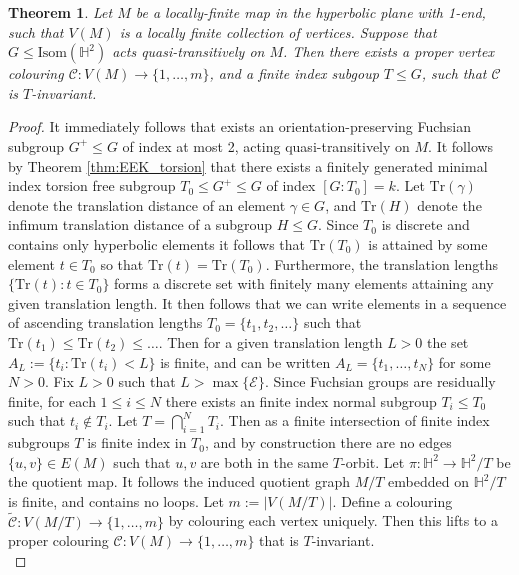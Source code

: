 \documentclass{article}
\numberwithin{equation}{section}
\newcommand{\HH}{\mathbb{H}}
\newtheorem{theorem}[lemma]{Theorem}
\theoremstyle{definition}
\theoremstyle{remark}
\begin{document}
\begin{theorem}\label{thm:main_Hyp}
    Let $M$ be a locally-finite map in the hyperbolic plane with 1-end, such that $V(M)$ is a locally finite collection of vertices. Suppose that $G\leq\text{Isom}(\HH^2)$ acts quasi-transitively on $M$. Then there exists a proper vertex colouring $\mathcal{C}:V(M)\rightarrow \{1,\ldots,m\}$, and a finite index subgoup $T\leq G$, such that $\mathcal{C}$ is $T$-invariant.
\end{theorem}
\begin{proof}
    It immediately follows that exists an orientation-preserving Fuchsian subgroup $G^+\leq G$ of index at most 2, acting quasi-transitively on $M$. It follows by Theorem \ref{thm:EEK_torsion} that there exists a finitely generated minimal index torsion free subgroup $T_0\leq G^+\leq G$ of index $[G:T_0]=k$. Let $\text{Tr}(\gamma)$ denote the translation distance of an element $\gamma\in G$, and $\text{Tr}(H)$ denote the infimum translation distance of a subgroup $H\leq G$. Since $T_0$ is discrete and contains only hyperbolic elements it follows that $\text{Tr}(T_0)$ is attained by some element $t\in T_0$ so that $\text{Tr}(t)=\text{Tr}(T_0)$. Furthermore, the translation lengths $\{\text{Tr}(t):t\in T_0\}$ forms a discrete set with finitely many elements attaining any given translation length. It then follows that we can write elements in a sequence of ascending translation lengths $T_0=\{t_1,t_2,\ldots\}$ such that $\text{Tr}(t_1)\leq \text{Tr}(t_2)\leq \ldots$\;. Then for a given translation length $L>0$ the set $A_L:=\{t_i: \text{Tr}(t_i)<L\}$ is finite, and can be written $A_L=\{t_1,\ldots,t_{N}\}$ for some $N>0$. Fix $L>0$ such that $L>\max\{\mathcal{E}\}$.
    Since Fuchsian groups are residually finite, for each $1\leq i\leq N$ there exists an finite index normal subgroup $T_i\leq T_0$ such that $t_i\not\in T_i$. Let $T=\bigcap_{i=1}^{N}T_i$. Then as a finite intersection of finite index subgroups $T$ is finite index in $T_0$, and by construction there are no edges $\{u,v\}\in E(M)$ such that $u,v$ are both in the same $T$-orbit. 
    Let $\pi:\HH^2\rightarrow \HH^2/T$ be the quotient map. It follows the induced quotient graph $M/T$ embedded on $\HH^2/T$ is finite, and contains no loops. Let $m:=|V(M/T)|$. Define a colouring $\widetilde{\mathcal{C}}:V(M/T)\rightarrow \{1,\ldots,m\}$ by colouring each vertex uniquely. Then this lifts to a proper colouring $\mathcal{C}:V(M)\rightarrow \{1,\ldots,m\}$ that is $T$-invariant.\\
\end{proof}
\end{document}
